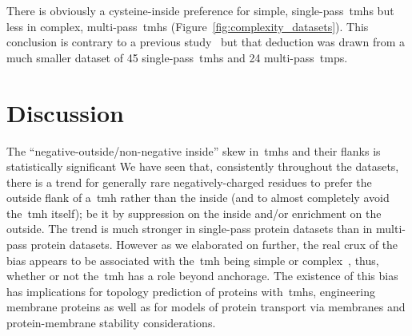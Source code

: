 There is obviously a cysteine-inside preference for simple, single\--pass~\gls{tmh}s but less in complex, multi\--pass~\gls{tmh}s (Figure~\ref{fig:complexity_datasets}).
This conclusion is contrary to a previous study~\cite{Nakashima1992} but that deduction was drawn from a much smaller dataset of 45 single\--pass~\gls{tmh}s and 24 multi\--pass~\gls{tmp}s.

\section{Discussion}

The ``negative-outside/non-negative inside'' skew in~\gls{tmh}s and their flanks is statistically significant
We have seen that, consistently throughout the datasets, there is a trend for generally rare negatively\--charged residues to prefer the outside flank of a~\gls{tmh} rather than the inside (and to almost completely avoid the~\gls{tmh} itself); be it by suppression on the inside and/or enrichment on the outside.
The trend is much stronger in single\--pass protein datasets than in multi\--pass protein datasets.
However as we elaborated on further, the real crux of the bias appears to be associated with the~\gls{tmh} being simple or complex~\cite{Wong2011, Wong2012}, thus, whether or not the~\gls{tmh} has a role beyond anchorage.
The existence of this bias has implications for topology prediction of proteins with~\gls{tmh}s, engineering membrane proteins as well as for models of protein transport via membranes and protein-membrane stability considerations.

